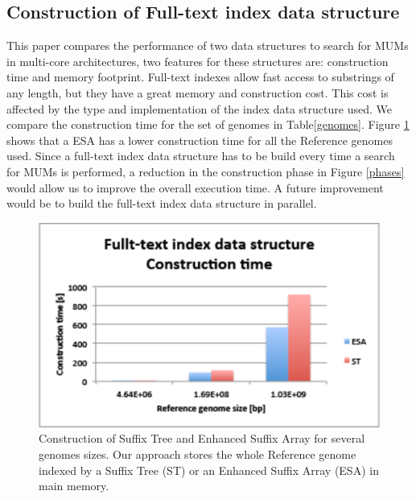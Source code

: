 \documentclass{acm_proc_article-sp}
\begin{document}
\subsection{Construction of Full-text index data structure}
This paper compares the performance of two data structures to search for MUMs in multi-core architectures, two features for these structures are: construction time and memory footprint. Full-text indexes allow fast access to substrings of any length, but they have a great memory and construction cost. This cost is affected by the type and implementation of the index data structure used. We compare the construction time for the set of genomes in Table\ref{genomes}. Figure \ref{fig:construction} shows that a ESA has a lower construction time for all the Reference genomes used. Since a full-text index data structure has to be build every time a search for MUMs is performed, a reduction in the construction phase in Figure \ref{phases} would allow us to improve the overall execution time. A future improvement would be to build the full-text index data structure in parallel.
 \begin{figure}[h]
  \centering
  \includegraphics[scale=0.6]{construction.eps}
  \caption{Construction of Suffix Tree and Enhanced Suffix Array for several genomes sizes. Our approach stores the whole Reference genome indexed by a Suffix Tree (ST) or an Enhanced Suffix Array (ESA) in main memory.}
  \label{fig:construction}
 \end{figure}  
\end{document}
